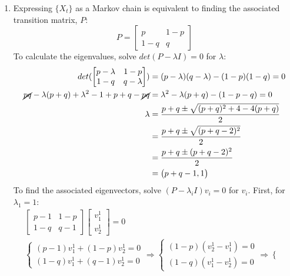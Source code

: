 \documentclass[]{article}
\begin{document}
\begin{enumerate}[label=\alph*)]
	 \item Expressing $\{X_t\}$ as a Markov chain is equivalent to finding the associated transition matrix, $P$:
	 \begin{equation}
	 	P=\begin{bmatrix}
	 	p & 1-p \\ 1-q & q
	 	\end{bmatrix} \nonumber
	 \end{equation}
	 To calculate the eigenvalues, solve $det(P-\lambda I)=0$ for $\lambda$:
	 \begin{equation}
	 	\begin{split}
	 	det(\begin{bmatrix}
	 	p-\lambda & 1-p \\ 1-q & q-\lambda
	 	\end{bmatrix})& = (p-\lambda)(q-\lambda)-(1-p)(1-q) = 0 \\ \nonumber
	 	\cancel{pq}-\lambda(p+q)+\lambda^2-1+p+q-\cancel{pq} & = \lambda^2 -\lambda(p+q) - (1-p-q) = 0 \\
	 	\lambda & = \frac{p+q\pm\sqrt{(p+q)^2+4-4(p+q)}}{2} \\
	 	& = \frac{p+q\pm\sqrt{(p+q-2)^2}}{2} \\
	 	& = \frac{p+q\pm(p+q-2)^2}{2} \\
	 	& = \begin{pmatrix}
	 	p+q-1 , 1
	 	\end{pmatrix}
	 	\end{split}
	 \end{equation}
	 To find the associated eigenvectors, solve $(P-\lambda_iI)v_i=0$ for $v_i$. First, for $\lambda_1=1$:
	 \begin{equation}
	 	\begin{split}
	 	\begin{bmatrix}
	 	p-1 & 1-p \\ 1-q & q-1
	 	\end{bmatrix}\begin{bmatrix}
	 	v_1^1 \\ v_2^1
	 	\end{bmatrix} = 0 \\ \nonumber	
	 	\begin{cases}
	 	(p-1)v_1^1 + (1-p)v_2^1 = 0 \\ (1-q)v_1^1+(q-1)v_2^1 = 0
	 	\end{cases} \Rightarrow
	 	\begin{cases}
	 	(1-p)(v_2^1-v_1^1)=0 \\ (1-q)(v_1^1 - v_2^1) = 0
	 	\end{cases} \Rightarrow \begin{cases}

\end{cases}
\end{split}
\end{equation}
\end{enumerate}
\end{document}
